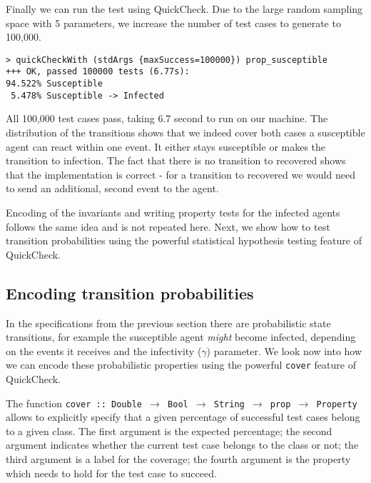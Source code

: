 Finally we can run the test using QuickCheck. Due to the large random sampling space with 5 parameters, we increase the number of test cases to generate to 100,000.

\begin{verbatim}
> quickCheckWith (stdArgs {maxSuccess=100000}) prop_susceptible
+++ OK, passed 100000 tests (6.77s):
94.522% Susceptible
 5.478% Susceptible -> Infected
\end{verbatim}

All 100,000 test cases pass, taking 6.7 second to run on our machine. The distribution of the transitions shows that we indeed cover both cases a susceptible agent can react within one event. It either stays susceptible or makes the transition to infection. The fact that there is no transition to recovered shows that the implementation is correct - for a transition to recovered we would need to send an additional, second event to the agent.

Encoding of the invariants and writing property tests for the infected agents follows the same idea and is not repeated here. Next, we show how to test transition probabilities using the powerful statistical hypothesis testing feature of QuickCheck.

\subsection{Encoding transition probabilities}

In the specifications from the previous section there are probabilistic state transitions, for example the susceptible agent \textit{might} become infected, depending on the events it receives and the infectivity ($\gamma$) parameter. We look now into how we can encode these probabilistic properties using the powerful \texttt{cover} feature of QuickCheck.

The function \texttt{cover :: Double $\rightarrow$ Bool $\rightarrow$ String $\rightarrow$ prop $\rightarrow$ Property} allows to explicitly specify that a given percentage of successful test cases belong to a given class. The first argument is the expected percentage; the second argument indicates whether the current test case belongs to the class or not; the third argument is a label for the coverage; the fourth argument is the property which needs to hold for the test case to succeed. 

